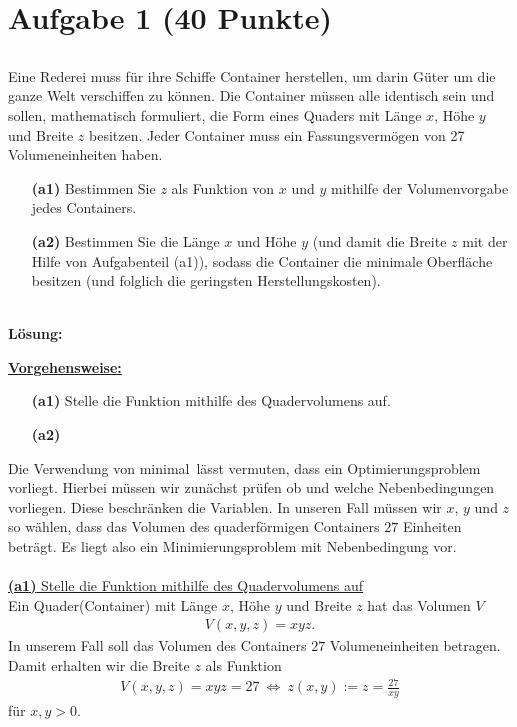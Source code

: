 \vspace{1cm}
\renewcommand{\labelenumi}{\theenumi.}
\section*{Aufgabe 1 (40 Punkte)}
\vspace{0.4cm}
\subsection*{}
Eine Rederei muss für ihre Schiffe Container herstellen, um darin Güter um die ganze Welt verschiffen zu können. Die Container müssen alle identisch sein und sollen, mathematisch formuliert, die Form eines Quaders  mit Länge $ x $, Höhe $ y $ und Breite $ z $ besitzen. Jeder Container muss ein Fassungsvermögen von 27 Volumeneinheiten haben. 
\begin{enumerate}
	\item[\textbf{(a1)}]
	Bestimmen Sie $ z $ als Funktion von $ x $ und $ y $ mithilfe der Volumenvorgabe jedes Containers.
	\item[\textbf{(a2)}] 
	Bestimmen Sie die Länge $ x $ und Höhe $ y $ (und damit die Breite $ z $ mit der Hilfe von Aufgabenteil (a1)), sodass die Container die minimale Oberfläche besitzen (und folglich die geringsten Herstellungskosten).
\end{enumerate}
\ \\
\textbf{Lösung:}
\begin{mdframed}
\underline{\textbf{Vorgehensweise:}}
\renewcommand{\labelenumi}{\theenumi.}
\begin{enumerate}
\item[\textbf{(a1)}] Stelle die Funktion mithilfe des Quadervolumens auf.
\item[\textbf{(a2)}] 
\end{enumerate}
\end{mdframed}
Die Verwendung von \glqq minimal\grqq \ lässt vermuten, dass ein Optimierungsproblem vorliegt.
Hierbei müssen wir zunächst prüfen ob und welche Nebenbedingungen vorliegen. Diese beschränken die Variablen. In unseren Fall müssen wir $ x $,  $ y $ und $ z $ so wählen, dass das Volumen des quaderförmigen Containers $ 27 $ Einheiten beträgt.
Es liegt also ein Minimierungsproblem mit Nebenbedingung vor.\\
\\
\underline{\textbf{(a1)} Stelle die Funktion mithilfe des Quadervolumens auf }\\
Ein Quader(Container) mit Länge $ x $, Höhe $ y $ und Breite $ z $ hat das Volumen $ V $
\begin{align*}
	V(x,y,z) = xyz.
\end{align*}
In unserem Fall soll das Volumen des Containers $ 27 $ Volumeneinheiten betragen.
Damit erhalten wir die Breite $ z $ als Funktion
\begin{align*}
	V(x,y,z) = xyz = 27  
	\ \Leftrightarrow \
	z(x,y) := z = \frac{27}{xy}
\end{align*}
für $ x,y > 0 $.





